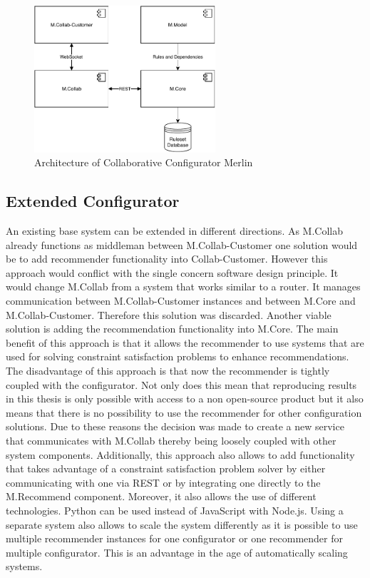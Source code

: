 \begin{figure}
    \centering
    \includegraphics[width=0.6\textwidth]{./figures/50_design_and_implementation/MerlinCollaborativeConfigurator.pdf}
    \caption{Architecture of Collaborative Configurator Merlin \cite[Fig. 4.3]{raabKollaborativeProduktkonfigurationEchtzeit2019}}
    \label{fig:DesignImplementation:CollaborativeConfiguratorMerlin}
\end{figure}


\subsection{Extended Configurator}
\label{subsec:DesignImplementation:ExtendedConfigurator}

An existing base system can be extended in different directions. As M.Collab already functions as middleman between M.Collab-Customer one solution would be to add recommender functionality into Collab-Customer. However this approach would conflict with the single concern software design principle. It would change M.Collab from a system that works similar to a router. It manages communication between M.Collab-Customer instances and between M.Core and M.Collab-Customer. Therefore this solution was discarded.
Another viable solution is adding the recommendation functionality into M.Core. The main benefit of this approach is that it allows the recommender to use systems that are used for solving constraint satisfaction problems to enhance recommendations. The disadvantage of this approach is that now the recommender is tightly coupled with the configurator. Not only does this mean that reproducing results in this thesis is only possible with access to a non open-source product but it also means that there is no possibility to use the recommender for other configuration solutions. Due to these reasons the decision was made to create a new service that communicates with M.Collab thereby being loosely coupled with other system components. Additionally, this approach also allows to add functionality that takes  advantage of a constraint satisfaction problem solver by either communicating with one via REST or by integrating one directly to the M.Recommend component. Moreover, it also allows the use of different technologies. Python can be used instead of JavaScript with Node.js. Using a separate system also allows to scale the system differently as it is possible to use multiple recommender instances for one configurator or one recommender for multiple configurator. This is an advantage in the age of automatically scaling systems.

